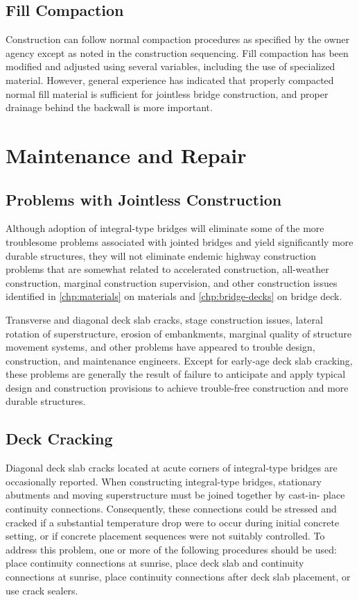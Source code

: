 \subsection{Fill Compaction}
Construction can follow normal compaction procedures as specified by the owner agency except as noted in the
construction sequencing. Fill compaction has been modified and adjusted using several variables, including the use of
specialized material. However, general experience has indicated that properly compacted normal fill material is
sufficient for jointless bridge construction, and proper drainage behind the backwall is more important.



\section{Maintenance and Repair}
\subsection{Problems with Jointless Construction}
Although adoption of integral-type bridges will eliminate some of the more troublesome problems associated with
jointed bridges and yield significantly more durable structures, they will not eliminate endemic highway construction
problems that are somewhat related to accelerated construction, all-weather construction, marginal construction
supervision, and other construction issues identified in \cref{chp:materials} on materials and \cref{chp:bridge-decks} on bridge deck.

Transverse and diagonal deck slab cracks, stage construction issues, lateral rotation of superstructure, erosion of embankments, marginal quality of structure movement systems, and other problems have appeared to trouble design, construction, and maintenance engineers. Except for early-age deck slab cracking, these problems are generally the result of failure to anticipate and apply typical design and construction provisions to achieve trouble-free construction and more durable structures.

\subsection{Deck Cracking}
Diagonal deck slab cracks located at acute corners of integral-type bridges are occasionally reported. When
constructing integral-type bridges, stationary abutments and moving superstructure must be joined together by cast-in-
place continuity connections. Consequently, these connections could be stressed and cracked if a substantial
temperature drop were to occur during initial concrete setting, or if concrete placement sequences were not suitably
controlled. To address this problem, one or more of the following procedures should be used: place continuity connections at sunrise, place deck slab and continuity connections at sunrise, place continuity connections after deck
slab placement, or use crack sealers.

